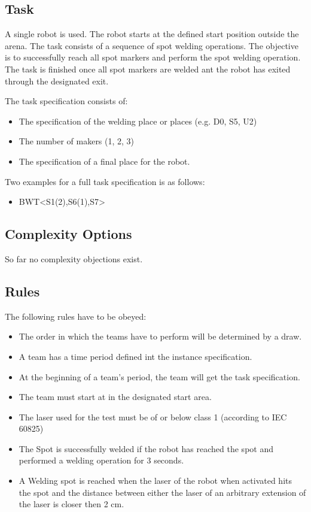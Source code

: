 \subsection{Task}
A single robot is used. The robot starts at the defined start position outside the arena. The task consists of a sequence of spot welding operations. The objective is to successfully reach all spot markers and perform the spot welding operation. The task is finished once all spot markers are welded ant the robot has exited through the designated exit.
\par
The task specification consists of: 
\begin{itemize}
	\item The specification of the welding place or places (e.g. D0, S5, U2)
	\item The number of makers (1, 2, 3)
	\item The specification of a final place for the robot.
\end{itemize}

Two examples for a full task specification is as follows:
\begin{itemize}
	\item BWT\textless S1(2),S6(1),S7\textgreater 
\end{itemize}


\subsection{Complexity Options}

So far no complexity objections exist.

\subsection{Rules}
The following rules have to be obeyed:

\begin{itemize}
\item The order in which the teams have to perform will be determined by a draw.
\item A team has a time period defined int the instance specification.
\item At the beginning of a team's period, the team will get the task specification. 
\item The team must start at in the designated start area.
\item The laser used for the test must be of or below class 1 (according to IEC 60825)
\item The Spot is successfully welded if the robot has reached the spot and performed a welding operation for 3 seconds.
\item A Welding spot is reached when the laser of the robot when activated hits the spot and the distance between either the laser of an arbitrary extension of the laser is closer then 2 cm.
\end{itemize}


